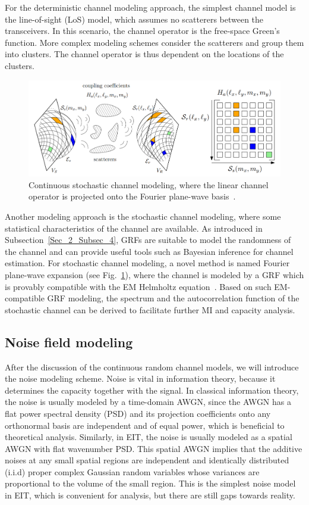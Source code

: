 \documentclass[journal,twocolumn]{IEEEtran}
\begin{document}
For the deterministic channel modeling approach, the simplest channel model is the line-of-sight (LoS) model, which assumes no scatterers between the transceivers. In this scenario, the channel operator is the free-space Green's function. More complex modeling schemes consider the scatterers and group them into clusters. The channel operator is thus dependent on the locations of the clusters.

\begin{figure}
	\centering 
	\includegraphics[width=\linewidth]{figures/random_channel.png} 
	\caption{Continuous stochastic channel modeling, where the linear channel operator is projected onto the Fourier plane-wave basis~\cite{marzetta2022fourier}.} 
	\label{fig:marzetta}
\end{figure}
Another modeling approach is the stochastic channel modeling, where some statistical characteristics of the channel are available. As introduced in Subsection~\ref{Sec_2_Subsec_4}, GRFs are suitable to model the randomness of the channel and can provide useful tools such as Bayesian inference for channel estimation. 
For stochastic channel modeling, a novel method is named Fourier plane-wave expansion (see Fig.~\ref{fig:marzetta}), where the channel is modeled by a GRF which is provably compatible with the EM Helmholtz equation~\cite{marzetta2022fourier}. 
Based on such EM-compatible GRF modeling, the spectrum and the autocorrelation function of the stochastic channel can be derived to facilitate further MI and capacity analysis.

\subsection{Noise field modeling}
After the discussion of the continuous random channel models, we will introduce the noise modeling scheme. 
Noise is vital in information theory, because it determines the capacity together with the signal. 
In classical information theory, the noise is usually modeled by a time-domain AWGN, since the AWGN has a flat power spectral density (PSD) and its projection coefficients onto any orthonormal basis are independent and of equal power, which is beneficial to theoretical analysis. 
Similarly, in EIT, the noise is usually modeled as a spatial AWGN with flat wavenumber PSD. This spatial AWGN implies that the additive noises at any small spatial regions are independent and identically distributed (i.i.d) proper complex Gaussian random variables whose variances are proportional to the volume of the small region. This is the simplest noise model in EIT, which is convenient for analysis, but there are still gaps towards reality. 
\end{document}
